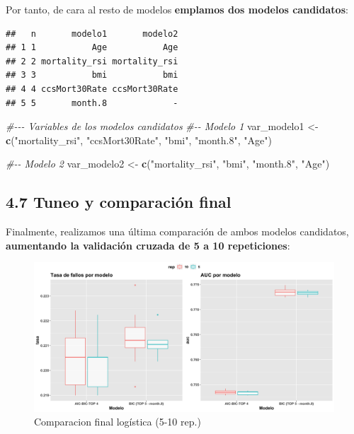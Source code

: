 \documentclass[
]{article}
\newenvironment{Shaded}{\begin{snugshade}}{\end{snugshade}}
\newcommand{\CommentTok}[1]{\textcolor[rgb]{0.56,0.35,0.01}{\textit{#1}}}
\newcommand{\KeywordTok}[1]{\textcolor[rgb]{0.13,0.29,0.53}{\textbf{#1}}}
\newcommand{\NormalTok}[1]{#1}
\newcommand{\StringTok}[1]{\textcolor[rgb]{0.31,0.60,0.02}{#1}}
\begin{document}
Por tanto, de cara al resto de modelos \textbf{emplamos dos modelos
candidatos}:

\begin{verbatim}
##   n       modelo1       modelo2
## 1 1           Age           Age
## 2 2 mortality_rsi mortality_rsi
## 3 3           bmi           bmi
## 4 4 ccsMort30Rate ccsMort30Rate
## 5 5       month.8             -
\end{verbatim}

\begin{Shaded}
\begin{Highlighting}[]
\CommentTok{\#{-}{-}{-} Variables de los modelos candidatos}
\CommentTok{\#{-}{-}  Modelo 1}
\NormalTok{var\_modelo1 <{-}}\StringTok{ }\KeywordTok{c}\NormalTok{(}\StringTok{"mortality\_rsi"}\NormalTok{, }\StringTok{"ccsMort30Rate"}\NormalTok{, }\StringTok{"bmi"}\NormalTok{, }\StringTok{"month.8"}\NormalTok{, }\StringTok{"Age"}\NormalTok{)}

\CommentTok{\#{-}{-} Modelo 2}
\NormalTok{var\_modelo2 <{-}}\StringTok{ }\KeywordTok{c}\NormalTok{(}\StringTok{"mortality\_rsi"}\NormalTok{, }\StringTok{"bmi"}\NormalTok{, }\StringTok{"month.8"}\NormalTok{, }\StringTok{"Age"}\NormalTok{)}
\end{Highlighting}
\end{Shaded}

\hypertarget{tuneo-y-comparaciuxf3n-final}{%
\subsection{4.7 Tuneo y comparación
final}\label{tuneo-y-comparaciuxf3n-final}}

Finalmente, realizamos una última comparación de ambos modelos
candidatos, \textbf{aumentando la validación cruzada de 5 a 10
repeticiones}:

\begin{figure}[h!]

{\centering \includegraphics[width=0.99\linewidth,height=0.99\textheight,]{./charts/01_feature_selection_comparacion_5_10_rep} 

}

\caption{Comparacion final logística (5-10 rep.)}\label{fig:unnamed-chunk-45}
\end{figure}
\end{document}
